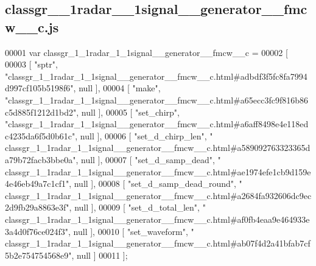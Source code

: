 \subsection{classgr\+\_\+\_\+1radar\+\_\+\_\+1signal\+\_\+\+\_\+generator\+\_\+\+\_\+fmcw\+\_\+\+\_\+c.\+js}
\label{classgr__1__1radar__1__1signal____generator____fmcw____c_8js_source}

\begin{DoxyCode}
00001 var classgr_1_1radar_1_1signal__generator__fmcw__c =
00002 [
00003     [ \textcolor{stringliteral}{"sptr"}, \textcolor{stringliteral}{"classgr\_1\_1radar\_1\_1signal\_\_generator\_\_fmcw\_\_c.html#adbdf3f5fc8fa7994d997cf105b5198f6"}, null
       ],
00004     [ \textcolor{stringliteral}{"make"}, \textcolor{stringliteral}{"classgr\_1\_1radar\_1\_1signal\_\_generator\_\_fmcw\_\_c.html#a65ecc3fc9f816b86c5d885f1212d1bd2"}, null
       ],
00005     [ \textcolor{stringliteral}{"set\_chirp"}, \textcolor{stringliteral}{"classgr\_1\_1radar\_1\_1signal\_\_generator\_\_fmcw\_\_c.html#a6aff8498e4e118edc4235da6f5d0b61c"},
       null ],
00006     [ \textcolor{stringliteral}{"set\_d\_chirp\_len"}, \textcolor{stringliteral}{"
      classgr\_1\_1radar\_1\_1signal\_\_generator\_\_fmcw\_\_c.html#a589092763323365da79b72facb3bbe0a"}, null ],
00007     [ \textcolor{stringliteral}{"set\_d\_samp\_dead"}, \textcolor{stringliteral}{"
      classgr\_1\_1radar\_1\_1signal\_\_generator\_\_fmcw\_\_c.html#ae1974efe1cb9d159e4e46eb49a7c1cf1"}, null ],
00008     [ \textcolor{stringliteral}{"set\_d\_samp\_dead\_round"}, \textcolor{stringliteral}{"
      classgr\_1\_1radar\_1\_1signal\_\_generator\_\_fmcw\_\_c.html#a2684fa932606dc9ec2d9fb29a8863e3f"}, null ],
00009     [ \textcolor{stringliteral}{"set\_d\_total\_len"}, \textcolor{stringliteral}{"
      classgr\_1\_1radar\_1\_1signal\_\_generator\_\_fmcw\_\_c.html#af0fb4eaa9e464933e3a4d0f76ce024f3"}, null ],
00010     [ \textcolor{stringliteral}{"set\_waveform"}, \textcolor{stringliteral}{"
      classgr\_1\_1radar\_1\_1signal\_\_generator\_\_fmcw\_\_c.html#ab07f4d2a41bfab7cf5b2e754754568e9"}, null ]
00011 ];
\end{DoxyCode}
